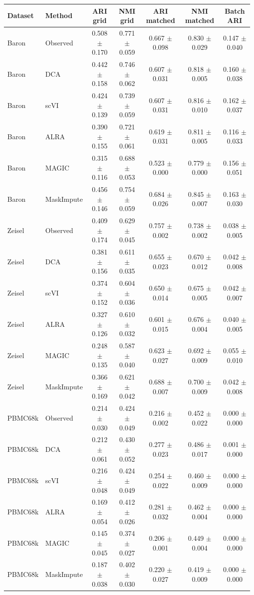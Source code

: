 \begin{tabular}{@{}llccccc@{}}
\toprule
Dataset & Method & ARI grid & NMI grid & ARI matched & NMI matched & Batch ARI \\
\midrule
Baron & Observed & 0.508 $\pm$ 0.170 & 0.771 $\pm$ 0.059 & 0.667 $\pm$ 0.098 & 0.830 $\pm$ 0.029 & 0.147 $\pm$ 0.040 \\
Baron & DCA & 0.442 $\pm$ 0.158 & 0.746 $\pm$ 0.062 & 0.607 $\pm$ 0.031 & 0.818 $\pm$ 0.005 & 0.160 $\pm$ 0.038 \\
Baron & scVI & 0.424 $\pm$ 0.139 & 0.739 $\pm$ 0.059 & 0.607 $\pm$ 0.031 & 0.816 $\pm$ 0.010 & 0.162 $\pm$ 0.037 \\
Baron & ALRA & 0.390 $\pm$ 0.155 & 0.721 $\pm$ 0.061 & 0.619 $\pm$ 0.031 & 0.811 $\pm$ 0.005 & 0.116 $\pm$ 0.033 \\
Baron & MAGIC & 0.315 $\pm$ 0.116 & 0.688 $\pm$ 0.053 & 0.523 $\pm$ 0.000 & 0.779 $\pm$ 0.000 & 0.156 $\pm$ 0.051 \\
Baron & MaskImpute & 0.456 $\pm$ 0.146 & 0.754 $\pm$ 0.059 & 0.684 $\pm$ 0.026 & 0.845 $\pm$ 0.007 & 0.163 $\pm$ 0.030 \\
\addlinespace
Zeisel & Observed & 0.409 $\pm$ 0.174 & 0.629 $\pm$ 0.045 & 0.757 $\pm$ 0.002 & 0.738 $\pm$ 0.002 & 0.038 $\pm$ 0.005 \\
Zeisel & DCA & 0.381 $\pm$ 0.156 & 0.611 $\pm$ 0.035 & 0.655 $\pm$ 0.023 & 0.670 $\pm$ 0.012 & 0.042 $\pm$ 0.008 \\
Zeisel & scVI & 0.374 $\pm$ 0.152 & 0.604 $\pm$ 0.036 & 0.650 $\pm$ 0.014 & 0.675 $\pm$ 0.005 & 0.042 $\pm$ 0.007 \\
Zeisel & ALRA & 0.327 $\pm$ 0.126 & 0.610 $\pm$ 0.032 & 0.601 $\pm$ 0.015 & 0.676 $\pm$ 0.004 & 0.040 $\pm$ 0.005 \\
Zeisel & MAGIC & 0.248 $\pm$ 0.135 & 0.587 $\pm$ 0.040 & 0.623 $\pm$ 0.027 & 0.692 $\pm$ 0.009 & 0.055 $\pm$ 0.010 \\
Zeisel & MaskImpute & 0.366 $\pm$ 0.169 & 0.621 $\pm$ 0.042 & 0.688 $\pm$ 0.007 & 0.700 $\pm$ 0.009 & 0.042 $\pm$ 0.008 \\
\addlinespace
PBMC68k & Observed & 0.214 $\pm$ 0.030 & 0.424 $\pm$ 0.049 & 0.216 $\pm$ 0.002 & 0.452 $\pm$ 0.022 & 0.000 $\pm$ 0.000 \\
PBMC68k & DCA & 0.212 $\pm$ 0.061 & 0.430 $\pm$ 0.052 & 0.277 $\pm$ 0.023 & 0.486 $\pm$ 0.017 & 0.001 $\pm$ 0.000 \\
PBMC68k & scVI & 0.216 $\pm$ 0.048 & 0.424 $\pm$ 0.049 & 0.254 $\pm$ 0.022 & 0.460 $\pm$ 0.009 & 0.000 $\pm$ 0.000 \\
PBMC68k & ALRA & 0.169 $\pm$ 0.054 & 0.412 $\pm$ 0.026 & 0.281 $\pm$ 0.032 & 0.462 $\pm$ 0.004 & 0.000 $\pm$ 0.000 \\
PBMC68k & MAGIC & 0.145 $\pm$ 0.045 & 0.374 $\pm$ 0.027 & 0.206 $\pm$ 0.001 & 0.449 $\pm$ 0.004 & 0.000 $\pm$ 0.000 \\
PBMC68k & MaskImpute & 0.187 $\pm$ 0.038 & 0.402 $\pm$ 0.030 & 0.220 $\pm$ 0.027 & 0.419 $\pm$ 0.009 & 0.000 $\pm$ 0.000 \\
\bottomrule
\end{tabular}
